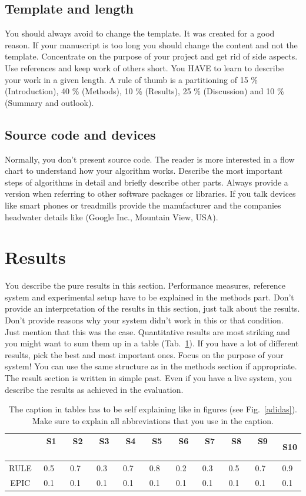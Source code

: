 \subsection{Template and length}
You should always avoid to change the template. It was created for a good reason. If your manuscript is too long you should change the content and not the template. Concentrate on the purpose of your project and get rid of side aspects. Use references and keep work of others short. You HAVE to learn to describe your work in a given length. A rule of thumb is a partitioning of 15 \% (Introduction), 40 \% (Methods), 10 \% (Results), 25 \% (Discussion) and 10 \% (Summary and outlook).

\subsection{Source code and devices}
Normally, you don't present source code. The reader is more interested in a flow chart to understand how your algorithm works.  Describe the most important steps of algorithms in detail and briefly describe other parts. Always provide a version when referring to other software packages or libraries. 
If you talk devices like smart phones or treadmills provide the manufacturer and the companies headwater details like (Google Inc., Mountain View, USA). 

\section{Results}
You describe the pure results in this section. Performance measures, reference system and experimental setup have to be explained in the methods part. Don't provide an interpretation of the results in this section, just talk about the results. Don't provide reasons why your system didn't work in this or that condition. Just mention that this was the case. Quantitative results are most striking and you might want to sum them up in a table (Tab.~\ref{result_table}). If you have a lot of different results, pick the best and most important ones. Focus on the purpose of your system! You can use the same structure as in the methods section if appropriate.\\
The result section is written in simple past. Even if you have a live system, you describe the results as achieved in the evaluation. 

\begin{table}[!t]
\caption{The caption in tables has to be self explaining like in figures (see Fig.~\ref{adidas}). Make sure to explain all abbreviations that you use in the caption.}
\begin{center}
\begin{tabular}{c|cccccccccc}
& \ S1 \ &\ S2 \ &\ S3 \ & \ S4 \ & \ S5 \ & \ S6 \ & \ S7 \ & \ S8 \ & \ S9 \ & \ S10\\
\hline
RULE&0.5&0.7&0.3&0.7&0.8&0.2&0.3&0.5&0.7&0.9\\
EPIC&0.1&0.1&0.1&0.1&0.1&0.1&0.1&0.1&0.1&0.1\\
\end{tabular}
\label{result_table}
\end{center}
\end{table}

